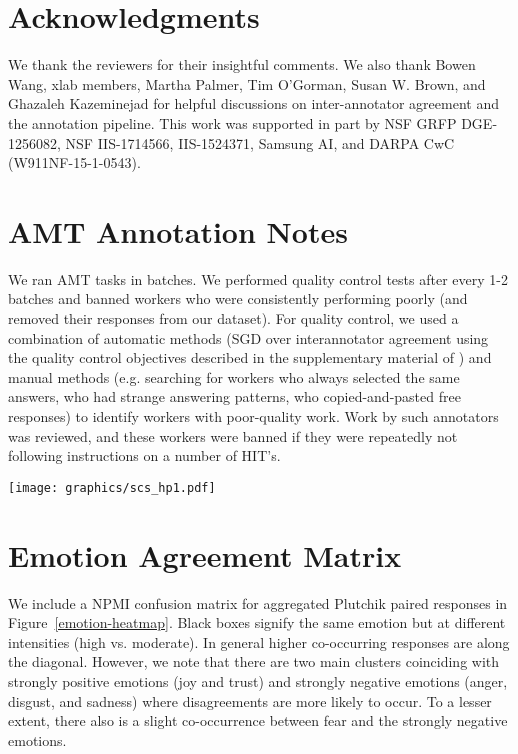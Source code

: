 \documentclass[11pt,a4paper]{article}
\begin{document}
 
\section*{Acknowledgments}
We thank the reviewers for their insightful comments.
We also thank Bowen Wang, 
xlab members, Martha Palmer, Tim O'Gorman, Susan W. Brown, and Ghazaleh Kazeminejad 
for helpful discussions on inter-annotator agreement and the annotation pipeline. 
This work was supported in part by
NSF GRFP DGE-1256082, NSF IIS-1714566, IIS-1524371, Samsung AI, 
and DARPA CwC (W911NF-15-1-0543).



\clearpage
\appendix




\section{AMT Annotation Notes}
We ran AMT tasks in batches. We performed quality control tests after every 1-2 batches and banned workers who were consistently performing poorly (and removed their responses from our dataset).  For quality control, we used a combination of automatic methods (SGD over interannotator agreement using the quality control objectives described in the supplementary material of \citealp{yatskar2016}) and manual methods (e.g. searching for workers who always selected the same answers, who had strange answering patterns, who copied-and-pasted free responses) to identify workers with poor-quality work. Work by such annotators was reviewed, and these workers were banned if they were repeatedly not following instructions on a number of HIT's.


\begin{figure*}[tb]
\begin{centering}
\texttt{[image: graphics/scs\_hp1.pdf]}
\vspace*{-2mm}
\caption{NPMI confusion matrix on emotion categories for all annotator pairs with color scaling for legibility.}
\label{emotion-heatmap}
\end{centering}
\end{figure*}

\section{Emotion Agreement Matrix}

We include a NPMI confusion matrix for aggregated Plutchik paired responses in Figure~\ref{emotion-heatmap}.  Black boxes signify the same emotion but at different intensities (high vs. moderate).  In general higher co-occurring responses are along the diagonal.  However, we note that there are two main clusters coinciding with strongly positive emotions (joy and trust) and strongly negative emotions (anger, disgust, and sadness) where disagreements are more likely to occur.  To a lesser extent, there also is a slight co-occurrence between fear and the strongly negative emotions.
\end{document}
